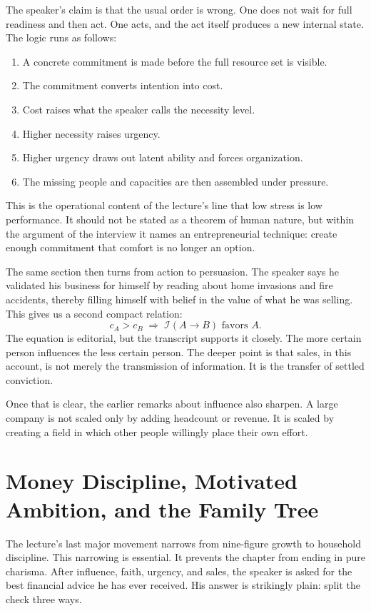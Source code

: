 The speaker's claim is that the usual order is wrong. One does not wait for full readiness and then act. One acts, and the act itself produces a new internal state. The logic runs as follows:
\begin{enumerate}
\item A concrete commitment is made before the full resource set is visible.
\item The commitment converts intention into cost.
\item Cost raises what the speaker calls the necessity level.
\item Higher necessity raises urgency.
\item Higher urgency draws out latent ability and forces organization.
\item The missing people and capacities are then assembled under pressure.
\end{enumerate}
This is the operational content of the lecture's line that low stress is low performance. It should not be stated as a theorem of human nature, but within the argument of the interview it names an entrepreneurial technique: create enough commitment that comfort is no longer an option.

The same section then turns from action to persuasion. The speaker says he validated his business for himself by reading about home invasions and fire accidents, thereby filling himself with belief in the value of what he was selling. This gives us a second compact relation:
\begin{equation}
c_A > c_B \;\Rightarrow\; \mathcal{I}(A\to B)\text{ favors }A.
\end{equation}
The equation is editorial, but the transcript supports it closely. The more certain person influences the less certain person. The deeper point is that sales, in this account, is not merely the transmission of information. It is the transfer of settled conviction.

Once that is clear, the earlier remarks about influence also sharpen. A large company is not scaled only by adding headcount or revenue. It is scaled by creating a field in which other people willingly place their own effort.

\section{Money Discipline, Motivated Ambition, and the Family Tree}

The lecture's last major movement narrows from nine-figure growth to household discipline. This narrowing is essential. It prevents the chapter from ending in pure charisma. After influence, faith, urgency, and sales, the speaker is asked for the best financial advice he has ever received. His answer is strikingly plain: split the check three ways.

